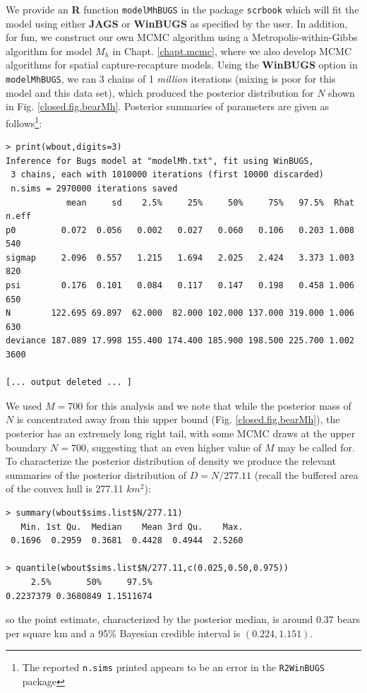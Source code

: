 We provide an {\bf R} function \mbox{\tt modelMhBUGS} in the package
\mbox{\tt scrbook} which will fit the model using either {\bf JAGS} or
{\bf WinBUGS} as specified by the user.  In addition, for fun, we
construct our own MCMC algorithm using a Metropolis-within-Gibbs
algorithm for model $M_{h}$ in Chapt. \ref{chapt.mcmc}, where we also
develop MCMC algorithms for spatial capture-recapture models.  Using
the {\bf WinBUGS} option in \mbox{\tt modelMhBUGS}, we ran 3 chains of 1
{\it million} iterations (mixing is poor for this model and this data
set), which produced the posterior distribution for $N$ shown in
Fig. \ref{closed.fig.bearMh}. Posterior summaries of parameters are
given as follows\footnote{The reported \mbox{\tt n.sims} printed appears
  to be an error in the \mbox{\tt R2WinBUGS} package}: 
{\small
\begin{verbatim}
> print(wbout,digits=3)
Inference for Bugs model at "modelMh.txt", fit using WinBUGS,
 3 chains, each with 1010000 iterations (first 10000 discarded)
 n.sims = 2970000 iterations saved
            mean     sd    2.5%     25%     50%     75%   97.5%  Rhat n.eff
p0         0.072  0.056   0.002   0.027   0.060   0.106   0.203 1.008   540
sigmap     2.096  0.557   1.215   1.694   2.025   2.424   3.373 1.003   820
psi        0.176  0.101   0.084   0.117   0.147   0.198   0.458 1.006   650
N        122.695 69.897  62.000  82.000 102.000 137.000 319.000 1.006   630
deviance 187.089 17.998 155.400 174.400 185.900 198.500 225.700 1.002  3600

[... output deleted ... ]
\end{verbatim}
}


We used $M=700$ for this analysis and we
note that  while the posterior mass of $N$ is concentrated away from this
upper bound (Fig. \ref{closed.fig.bearMh}), the posterior has an
extremely long right tail, with some MCMC draws at the upper
boundary $N=700$, suggesting that an even higher value of $M$ may be
called for. 
To characterize the posterior distribution of density we produce the
relevant summaries of the posterior distribution of $D  = N/277.11$
(recall 
the buffered area of the convex hull is 277.11 $km^2$):
{\small
\begin{verbatim}
> summary(wbout$sims.list$N/277.11)
   Min. 1st Qu.  Median    Mean 3rd Qu.    Max. 
 0.1696  0.2959  0.3681  0.4428  0.4944  2.5260 

> quantile(wbout$sims.list$N/277.11,c(0.025,0.50,0.975))
     2.5%       50%     97.5% 
0.2237379 0.3680849 1.1511674 
\end{verbatim}
}
so the point estimate, characterized by the posterior median, is around
$0.37$ bears per square km and a 95\% Bayesian credible interval is
$(0.224, 1.151)$.


